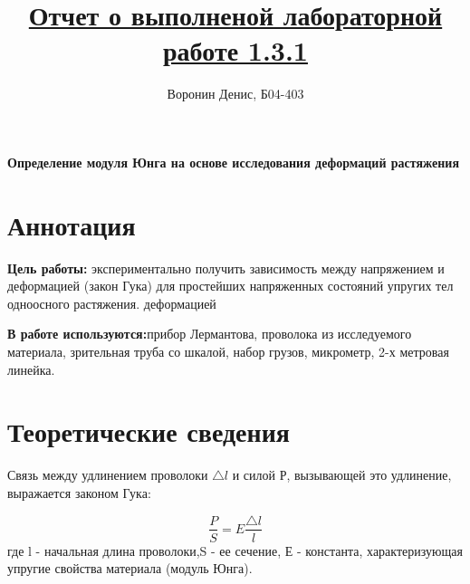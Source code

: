 \documentclass[a4paper]{article}
\title{\underline{Отчет о выполненой лабораторной работе 1.3.1}}
\author{Воронин Денис, Б04-403}
\begin{document}
\maketitle
\begin{center}
    \textbf{Определение модуля Юнга на основе
    исследования деформаций растяжения}
\end{center}

\section{Аннотация}
\textbf{Цель работы:} экспериментально получить зависимость между напряжением и деформацией
(закон Гука) для простейших напряженных состояний упругих тел одноосного растяжения.
деформацией

\textbf{В работе используются:}прибор Лермантова, проволока из исследуемого материала, зрительная
труба со шкалой, набор грузов, микрометр, 2-х метровая линейка.

\section{Теоретические сведения}
Связь между удлинением проволоки $\bigtriangleup l$ и силой Р, вызывающей это удлинение, выражается
законом Гука:\par
\[\frac{P}{S} = E\frac{\bigtriangleup l}{l}\]  
где l - начальная длина проволоки,S - ее сечение, Е - константа, характеризующая упругие
свойства материала (модуль Юнга).
\end{document}
